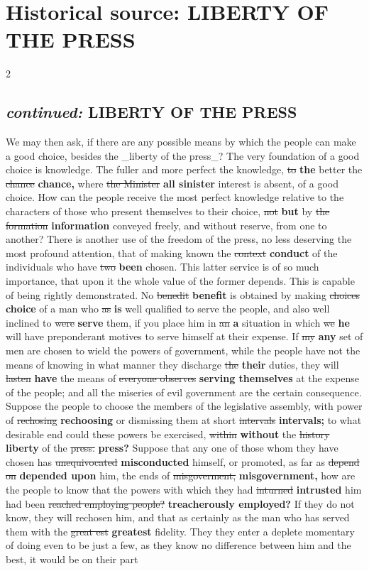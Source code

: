 \documentclass[10pt]{article}
\begin{document}
\section*{Historical source: LIBERTY OF THE PRESS}
\begin{multicols}{2}
\subsection*{\textit{continued:} LIBERTY OF THE PRESS}
We may then ask, if there are any possible means by which the people can make a good choice, besides the \_liberty of the press\_? The very foundation of a good choice is knowledge. The fuller and more perfect the knowledge, \sout{to} \textbf{the} better the \sout{chance} \textbf{chance,} where \sout{the Minister} \textbf{all sinister} interest is absent, of a good choice. How can the people receive the most perfect knowledge relative to the characters of those who present themselves to their choice, \sout{not} \textbf{but} by \sout{the formation} \textbf{information} conveyed freely, and without reserve, from one to another? There is another use of the freedom of the press, no less deserving the most profound attention, that of making known the \sout{context} \textbf{conduct} of the individuals who have \sout{two} \textbf{been} chosen. This latter service is of so much importance, that upon it the whole value of the former depends. This is capable of being rightly demonstrated. No \sout{benedit} \textbf{benefit} is obtained by making \sout{choices} \textbf{choice} of a man who \sout{as} \textbf{is} well qualified to serve the people, and also well inclined to \sout{were} \textbf{serve} them, if you place him in \sout{an} \textbf{a} situation in which \sout{we} \textbf{he} will have preponderant motives to serve himself at their expense. If \sout{my} \textbf{any} set of men are chosen to wield the powers of government, while the people have not the means of knowing in what manner they discharge \sout{the} \textbf{their} duties, they will \sout{lasten} \textbf{have} the means of \sout{everyone observes} \textbf{serving themselves} at the expense of the people; and all the miseries of evil government are the certain consequence. Suppose the people to choose the members of the legislative assembly, with power of \sout{rechosing} \textbf{rechoosing} or dismissing them at short \sout{intervals} \textbf{intervals;} to what desirable end could these powers be exercised, \sout{within} \textbf{without} the \sout{history} \textbf{liberty} of the \sout{press.} \textbf{press?} Suppose that any one of those whom they have chosen has \sout{unequivocated} \textbf{misconducted} himself, or promoted, as far as \sout{depend on} \textbf{depended upon} him, the ends of \sout{misgoverment,} \textbf{misgovernment,} how are the people to know that the powers with which they had \sout{inturned} \textbf{intrusted} him had been \sout{reached employing people?} \textbf{treacherously employed?} If they do not know, they will rechosen him, and that as certainly as the man who has served them with the \sout{great est} \textbf{greatest} fidelity. They they enter a deplete momentary of doing even to be just a few, as they know no difference between him and the best, it would be on their part 
\end{multicols}
\end{document}

